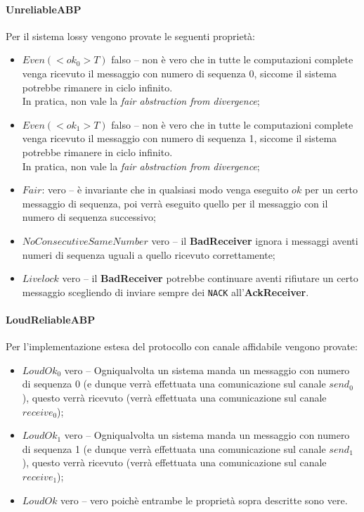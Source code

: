\paragraph{UnreliableABP} \mbox{}

Per il sistema lossy vengono provate le seguenti proprietà:

\begin{itemize}
  \item $Even(<ok_0>T)$ falso -- non è vero che in tutte le computazioni
    complete venga ricevuto il messaggio con numero di sequenza 0, siccome il
    sistema potrebbe rimanere in ciclo infinito. \\
    In pratica, non vale la \emph{fair abstraction from divergence};
  \item $Even(<ok_1>T)$ falso -- non è vero che in tutte le computazioni
    complete venga ricevuto il messaggio con numero di sequenza 1, siccome il
    sistema potrebbe rimanere in ciclo infinito. \\
    In pratica, non vale la \emph{fair abstraction from divergence};
  \item $Fair$: vero -- è invariante che in qualsiasi modo venga eseguito $ok$
    per un certo messaggio di sequenza, poi verrà eseguito quello per il
    messaggio con il numero di sequenza successivo;
  \item $NoConsecutiveSameNumber$ vero -- il \textbf{BadReceiver} ignora i
    messaggi aventi numeri di sequenza uguali a quello ricevuto correttamente;
  \item $Livelock$ vero -- il \textbf{BadReceiver} potrebbe continuare aventi
    rifiutare un certo messaggio scegliendo di inviare sempre dei \texttt{NACK}
    all'\textbf{AckReceiver}.
\end{itemize}

\paragraph{LoudReliableABP} \mbox{}

Per l'implementazione estesa del protocollo con canale affidabile vengono
provate:

\begin{itemize}
  \item $LoudOk_0$ vero -- Ogniqualvolta un sistema manda un messaggio con
    numero di sequenza 0 (e dunque verrà effettuata una comunicazione sul
    canale $send_0$), questo verrà ricevuto (verrà effettuata una
    comunicazione sul canale $receive_0$);
  \item $LoudOk_1$ vero -- Ogniqualvolta un sistema manda un messaggio con
    numero di sequenza 1 (e dunque verrà effettuata una comunicazione sul
    canale $send_1$), questo verrà ricevuto (verrà effettuata una
    comunicazione sul canale $receive_1$);
  \item $LoudOk$ vero -- vero poichè entrambe le proprietà sopra descritte
    sono vere.
\end{itemize}

